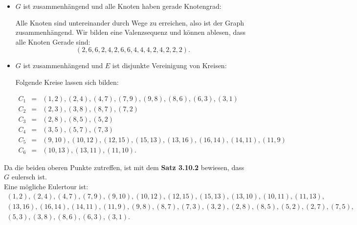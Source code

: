 \documentclass[12pt]{article}
\begin{document}
\begin{itemize}
\item $G$ ist zusammenhängend und alle Knoten haben gerade Knotengrad:

Alle Knoten sind untereinander durch Wege zu erreichen, also ist der Graph zusammenhängend. 
Wir bilden eine Valenzsequenz und können ablesen, dass alle Knoten Gerade sind:
$$
(2, 6, 6, 2, 4, 2, 6, 6, 4, 4, 4, 2, 4, 2, 2, 2) .
$$


\item $G$ ist zusammenhängend und $E$ ist disjunkte Vereinigung von Kreisen:

Folgende Kreise lassen sich bilden:

\begin{eqnarray*}
C_1&=&(1, 2), (2,4),(4,7),(7,9),(9,8),(8,6),(6,3),(3,1) \\
C_2&=&(2,3),(3,8),(8,7),(7,2) \\
C_3&=&(2,8),(8,5),(5,2) \\
C_4&=&(3,5),(5,7),(7,3) \\
C_5&=&(9,10),(10,12),(12,15),(15,13),(13,16),(16,14),(14,11),(11,9) \\
C_6&=&(10,13),(13,11),(11,10).
\end{eqnarray*}

\end{itemize}

Da die beiden oberen Punkte zutreffen, ist mit dem \textbf{Satz 3.10.2} bewiesen, dass $G$ 
eulersch ist. \\

Eine mögliche Eulertour ist:
\begin{eqnarray*}
(1, 2), (2, 4), (4,7),(7,9),(9,10),(10,12),(12,15),(15,13),(13,10),(10,11),(11,13), \\
(13,16),(16,14),(14,11),(11,9),(9,8),(8,7),(7,3),(3,2),(2,8),(8,5),(5,2),(2,7),(7,5),\\
(5,3),(3,8),(8,6),(6,3),(3,1). \\
\end{eqnarray*}

\newpage
\listoffigures
\end{document}
